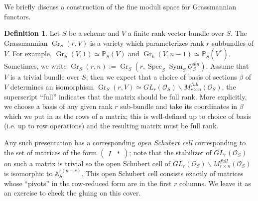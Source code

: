 \documentclass[10pt]{article}
\theoremstyle{definition}
\newtheorem{defn}[thm]{Definition}
\DeclareMathOperator{\Spec}{Spec}
\DeclareMathOperator{\Sym}{Sym}
\newcommand{\bs}{\backslash}
\DeclareMathOperator{\Gr}{Gr}
\newcommand{\OO}{\mathcal{O}}
\newcommand{\todo}[1]{\textbf{\textcolor{red}{TODO #1}}}
\begin{document}
We briefly discuss a construction of the fine moduli space for Grassmannian functors.
\begin{defn}
Let $S$ be a scheme and $V$ a finite rank vector bundle over $S$.  The Grassmannian $\Gr_S(r, V)$ is a variety which parameterizes rank $r$-subbundles of $V$.  For example, $\Gr_S(V, 1) \simeq \mathbb{P}_S(V)$ and $\Gr_k(V, n-1) \simeq \mathbb{P}_S(V^*)$.  Sometimes, we write $\Gr_S(r, n) := \Gr_S(r, \Spec_S \Sym_S \OO_S^{\oplus n}).$  Assume that $V$ is a trivial bundle over $S$; then we expect that a choice of basis of sections $\beta$ of $V$ determines an isomorphism $\Gr_S(r, V) \simeq GL_r(\OO_S)\bs M_{r \times n}^{full}(\OO_S)$, the superscript ``full'' indicates that the matrix should be full rank.  More explicitly, we choose a basis of any given rank $r$ sub-bundle and take its coordinates in $\beta$ which we put in as the rows of a matrix; this is well-defined up to choice of basis (i.e. up to row operations) and the resulting matrix must be full rank.  

Any such presentation has a corresponding \emph{open Schubert cell} corresponding to the set of matrices of the form $\begin{pmatrix} I &  *\end{pmatrix}$; note that the stabilizer of $GL_r(\OO_S)$ on such a matrix is trivial so the open Schubert cell of $GL_r(\OO_S)\bs M_{r \times n}^{full}(\OO_S)$ is isomorphic to $\mathbb{A}^{r(n-r)}_S$.  This open Schubert cell consists exactly of matrices whose ``pivots'' in the row-reduced form are in the first $r$ columns.  We leave it as an exercise to check the gluing on this cover.
%
%
%
%
%
%
%
%
\end{defn}
\end{document}
